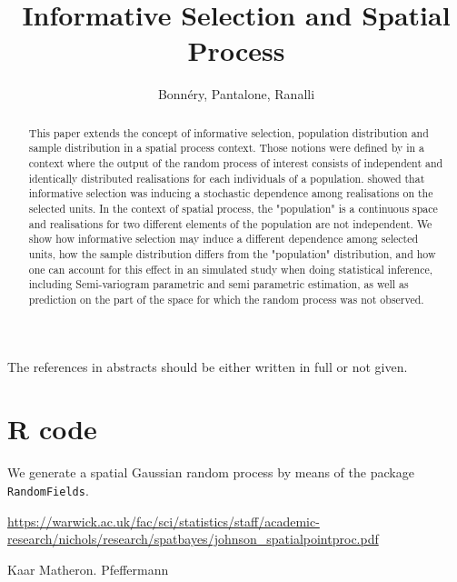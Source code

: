 \documentclass[12pt]{article}
\title{Informative Selection and Spatial Process}
\date{}
\author{Bonn\'ery,  Pantalone, Ranalli}
\theoremstyle{definition}
\theoremstyle{remark}
\begin{document}
\normalem %

\maketitle

\tableofcontents

\begin{abstract}
This paper extends the concept of informative selection, population distribution and sample distribution in a spatial process context.
Those notions were defined by 
\cite{pfefferman_1992} in a context where the output of the random process of interest consists of independent and identically distributed realisations for each individuals of a population. \cite{BonneryBreidtCoquet} showed that informative selection was inducing a stochastic dependence among realisations on the selected units. In the context of spatial process, the "population" is a continuous space and realisations for two different elements of the population are not independent. We show how informative selection may induce a different dependence among selected units, how the sample distribution differs from the "population" distribution, and how one can  account for this effect in an simulated study when doing statistical inference, including Semi-variogram parametric and semi parametric estimation, as well as prediction on the part of the space for which the random process was not observed.
\end{abstract}

{\color{red} The references in abstracts should be either written in full or not given}.









\appendix

\section{R code}


We generate a spatial Gaussian random process by means of the package \texttt{RandomFields}.





\url{https://warwick.ac.uk/fac/sci/statistics/staff/academic-research/nichols/research/spatbayes/johnson_spatialpointproc.pdf}

Kaar
Matheron.
Pfeffermann


\end{document}
